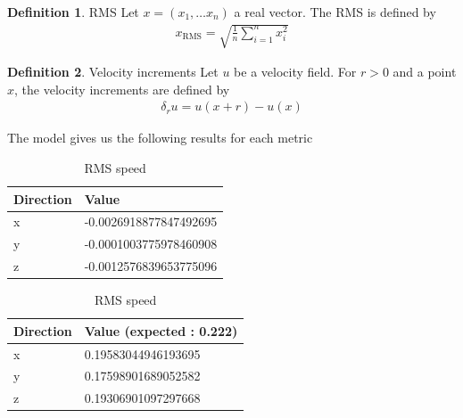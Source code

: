 \documentclass[a4paper,12pt]{article}
\theoremstyle{definition}
\newtheorem{definition}{Definition}
\begin{document}
\begin{definition}{RMS}
    Let $x=(x_1,\ldots x_n)$ a real vector. The RMS is defined by 
    \begin{align}
        x_\text{RMS} = \sqrt{\frac{1}{n}\sum_{i=1}^{n}x_i^2}
    \end{align}
\end{definition}

\begin{definition}{Velocity increments}
    Let $u$ be a velocity field. For $r>0$ and a point $x$, the velocity increments are defined by 
    \begin{align}
        \delta_r u = u(x+r)-u(x) 
        \label{DefVelIncr}
    \end{align}
\end{definition}

The model gives us the following results for each metric 

\begin{table}[h]
\centering
\begin{minipage}{0.45\textwidth}
\centering
\begin{tabular}{ll}
\toprule
\textbf{Direction} & \textbf{Value} \\
\midrule
x & -0.0026918877847492695 \\
y & -0.0001003775978460908 \\
z & -0.0012576839653775096 \\
\bottomrule
\end{tabular}
\caption{Velocity mean}
\label{BaseMean}
\end{minipage}
\hfill
\begin{minipage}{0.45\textwidth}
\centering
\begin{tabular}{ll}
\toprule
\textbf{Direction} & \textbf{Value (expected : 0.222)} \\
\midrule
x & 0.19583044946193695 \\
y & 0.17598901689052582 \\
z & 0.19306901097297668 \\
\bottomrule
\end{tabular}
\caption{RMS speed}
\label{BaseRMSspeed}
\end{minipage}
\end{table}
\end{document}

